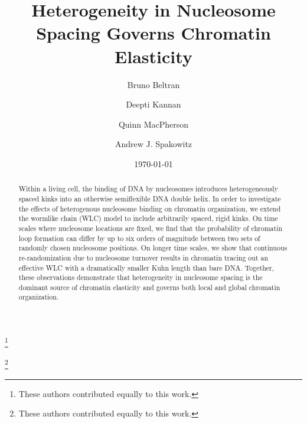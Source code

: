 \documentclass[%
 reprint,
superscriptaddress,
showpacs,preprintnumbers,
 amsmath,amssymb,
 aps,
 prl,
]{revtex4-1}
\begin{document}
\title{Heterogeneity in Nucleosome Spacing Governs Chromatin Elasticity}%

\author{Bruno Beltran}
\thanks{These authors contributed equally to this work.}%
%
\author{Deepti Kannan}%
\thanks{These authors contributed equally to this work.}%
\author{Quinn MacPherson}%
%
\author{Andrew J. Spakowitz}%
%
%
%
%
\date{\today}%

\begin{abstract}
Within a living cell, the binding of DNA by nucleosomes introduces heterogeneously spaced
    kinks into an otherwise semiflexible DNA double helix.
In order to investigate the effects of heterogenous nucleosome binding on chromatin organization, we extend the wormlike chain (WLC) model to include arbitrarily spaced,
    rigid kinks.
On time scales where nucleosome locations are fixed, we find that the probability of chromatin loop formation can differ by up to six orders of magnitude between two sets of randomly chosen nucleosome positions.
On longer time scales, we show that continuous re-randomization due to nucleosome turnover results in chromatin tracing out an effective WLC with a dramatically smaller Kuhn length than bare DNA.
Together, these observations demonstrate that heterogeneity in nucleosome spacing
    is the dominant source of chromatin elasticity and governs both local and
    global chromatin organization.
\end{abstract}

\maketitle
\end{document}
